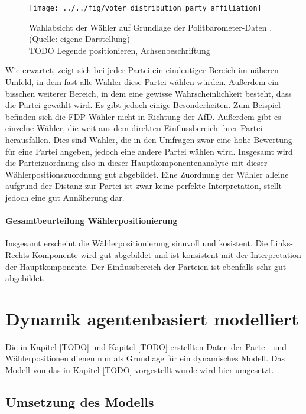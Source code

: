 \begin{figure}[htb]
	\centering
	\texttt{[image: ../../fig/voter\_distribution\_party\_affiliation]}
	\caption{Wahlabsicht der Wähler auf Grundlage der Politbarometer-Daten \citep{politbarometer}. (Quelle: eigene Darstellung)\\TODO Legende positionieren, Achsenbeschriftung}
	\label{fig:voter-positions-pca-party-affiliation}
\end{figure}

Wie erwartet, zeigt sich bei jeder Partei ein eindeutiger Bereich im näheren Umfeld, in dem fast alle Wähler diese Partei wählen würden. Außerdem ein bisschen weiterer Bereich, in dem eine gewisse Wahrscheinlichkeit besteht, dass die Partei gewählt wird. Es gibt jedoch einige Besonderheiten. Zum Beispiel befinden sich die FDP-Wähler nicht in Richtung der AfD. Außerdem gibt es einzelne Wähler, die weit aus dem direkten Einflussbereich ihrer Partei herausfallen. Dies sind Wähler, die in den Umfragen zwar eine hohe Bewertung für eine Partei angeben, jedoch eine andere Partei wählen wird.
Insgesamt wird die Parteizuordnung also in dieser Hauptkomponentenanalyse mit dieser Wählerpositionszuordnung gut abgebildet. Eine Zuordnung der Wähler alleine aufgrund der Distanz zur Partei ist zwar keine perfekte Interpretation, stellt jedoch eine gut Annäherung dar.

\paragraph{Gesamtbeurteilung Wählerpositionierung}
Insgesamt erscheint die Wählerpositionierung sinnvoll und kosistent. Die Links-Rechts-Komponente wird gut abgebildet und ist konsistent mit der Interpretation der Hauptkomponente. Der Einflussbereich der Parteien ist ebenfalls sehr gut abgebildet.

\section{Dynamik agentenbasiert modelliert}

Die in Kapitel [TODO] und Kapitel [TODO] erstellten Daten der Partei- und Wählerpositionen dienen nun als Grundlage für ein dynamisches Modell. Das Modell von \citet{laver2005policy} das in Kapitel [TODO] vorgestellt wurde wird hier umgesetzt.

\subsection{Umsetzung des Modells}

